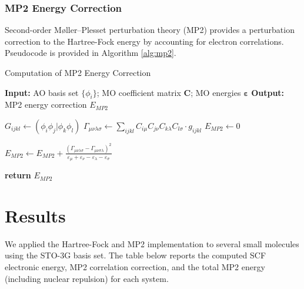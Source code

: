 \documentclass[12pt]{article}
\begin{document}
\subsubsection*{MP2 Energy Correction}

Second-order Møller–Plesset perturbation theory (MP2) provides a perturbation correction to the Hartree-Fock energy by accounting for electron correlations. Pseudocode is provided in Algorithm \ref{alg:mp2}. 

\begin{algorithm}[H]
    \caption{Computation of MP2 Energy Correction}
    \begin{algorithmic}[1]
        \Statex \textbf{Input:} AO basis set $\{\phi_i\}$; MO coefficient matrix $\mathbf{C}$; MO energies $\boldsymbol{\varepsilon}$
        \Statex \textbf{Output:} MP2 energy correction $E_{MP2}$

        \State $G_{ijkl} \gets (\phi_i \phi_j | \phi_k \phi_l)$ 
        \State $\Gamma_{\mu \nu \lambda \sigma} \gets \sum_{ijkl} C_{i \mu} C_{j \nu} C_{k \lambda} C_{l \sigma} \cdot g_{ijkl}$ 
        \State $E_{MP2} \gets 0$ 

                \State $E_{MP2} \gets E_{MP2} + \frac{(\Gamma_{\mu \nu \lambda \sigma} - \Gamma_{\mu \nu \sigma \lambda})^2}{\varepsilon_\mu + \varepsilon_\nu - \varepsilon_\lambda - \varepsilon_\sigma}$ 
            \EndFor
        \EndFor

        \State \textbf{return} $E_{MP2}$
    \end{algorithmic}
    \label{alg:mp2}
\end{algorithm}


\section{Results}

We applied the Hartree-Fock and MP2 implementation to several small molecules using the STO-3G basis set. The table below reports the computed SCF electronic energy, MP2 correlation correction, and the total MP2 energy (including nuclear repulsion) for each system.
\end{document}
